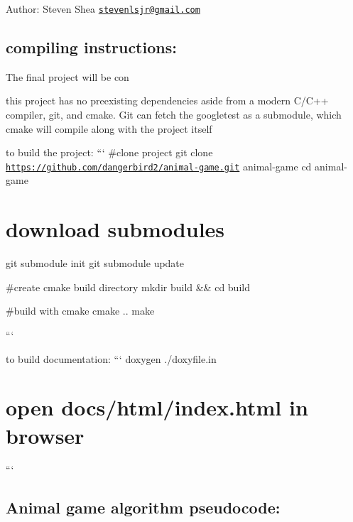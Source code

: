 Author\+: Steven Shea \href{mailto:stevenlsjr@gmail.com}{\tt stevenlsjr@gmail.\+com}

\subsection*{compiling instructions\+: }

The final project will be con

this project has no preexisting dependencies aside from a modern C/\+C++ compiler, git, and cmake. Git can fetch the googletest as a submodule, which cmake will compile along with the project itself

to build the project\+: ``` \#clone project git clone \href{https://github.com/dangerbird2/animal-game.git}{\tt https\+://github.\+com/dangerbird2/animal-\/game.\+git} animal-\/game cd animal-\/game

\section*{download submodules}

git submodule init git submodule update

\#create cmake build directory mkdir build \&\& cd build

\#build with cmake cmake .. make

```

to build documentation\+: ``` doxygen ./doxyfile.in \section*{open docs/html/index.\+html in browser}

```

\subsection*{Animal game algorithm pseudocode\+: }


